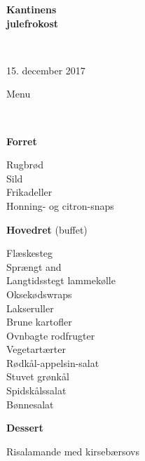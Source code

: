 \begin{center}
\begin{HUGE}
\textbf{Kantinens \\[3mm] julefrokost}
\end{HUGE}
\\[.6cm]
\begin{Large}
15. december 2017
\end{Large}
\end{center}
\vspace*{.01cm}
\begin{center}
\begin{huge}
Menu
\end{huge}
\\[.1cm]
\end{center}
\newcommand{\course}[1]{\vspace*{4mm} \textbf{#1} \vspace{-7mm}}
\newcommand{\goodindent}{\null\hspace{23mm}}
{\small
\begin{center}
\course{Forret}
\end{center}
  \goodindent Rugbrød
\\\goodindent Sild
\\\goodindent Frikadeller
\\\goodindent Honning- og citron-snaps

\begin{center}
\course{Hovedret} (buffet)
\end{center}
  \goodindent Flæskesteg
\\\goodindent Sprængt and
\\\goodindent Langtidsstegt lammekølle
\\\goodindent Oksekødswraps
\\\goodindent Lakseruller
\\\goodindent Brune kartofler
\\\goodindent Ovnbagte rodfrugter
\\\goodindent Vegetartærter
\\\goodindent Rødkål-appelsin-salat
\\\goodindent Stuvet grønkål
\\\goodindent Spidskålssalat
\\\goodindent Bønnesalat

\begin{center}
\course{Dessert}
\end{center}
  \goodindent Risalamande med kirsebærsovs
}
